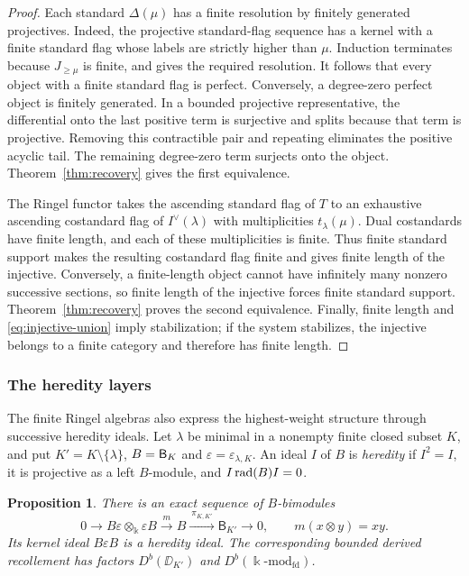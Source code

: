 \documentclass[11pt,reqno]{amsart}
\newcommand{\kk}{\Bbbk}\newcommand{\ZZ}{\mathbb Z}\newcommand{\NN}{\mathbb N}
\newtheorem{proposition}[theorem]{Proposition}
\theoremstyle{definition}
\theoremstyle{remark}
\numberwithin{equation}{section}
\begin{document}
\begin{proof}
Each standard $\Delta(\mu)$ has a finite resolution by finitely
generated projectives. Indeed, the projective standard-flag sequence
has a kernel with a finite standard flag whose labels are strictly
higher than $\mu$. Induction terminates because $J_{\geq\mu}$ is
finite, and gives the required resolution. It follows that every
object with a finite standard flag is perfect. Conversely, a
degree-zero perfect object is finitely generated. In a bounded
projective representative, the differential onto the last positive
term is surjective and splits because that term is projective.
Removing this contractible pair and repeating eliminates the positive
acyclic tail. The remaining degree-zero term surjects onto the object.
Theorem~\ref{thm:recovery} gives the first equivalence.

The Ringel functor takes the ascending standard flag of $T$ to an
exhaustive ascending costandard flag of $I^\vee(\lambda)$ with multiplicities
$t_\lambda(\mu)$. Dual costandards have finite length, and each of
these multiplicities is finite. Thus finite standard support makes
the resulting costandard flag finite and gives finite length of the
injective. Conversely, a finite-length object cannot have infinitely
many nonzero successive sections, so finite length of the injective
forces finite standard support. Theorem~\ref{thm:recovery} proves
the second equivalence. Finally, finite length and
\eqref{eq:injective-union} imply stabilization; if the system
stabilizes, the injective belongs to a finite category and therefore
has finite length.
\end{proof}

\subsubsection{The heredity layers}

The finite Ringel algebras also express the highest-weight structure
through successive heredity ideals. Let $\lambda$ be minimal in a nonempty finite
closed subset $K$, and put $K'=K\setminus\{\lambda\}$,
$B=\mathsf B_K$ and $\varepsilon=\varepsilon_{\lambda,K}$.
An ideal $I$ of $B$ is \emph{heredity} if $I^2=I$, it is projective
as a left $B$-module, and $I\operatorname{rad}(B)I=0$.

\begin{proposition}\label{prop:heredity-layer}
There is an exact sequence of $B$-bimodules
\begin{equation}\label{eq:heredity-sequence}
 0\longrightarrow B\varepsilon\otimes_{\kk}\varepsilon B
   \xrightarrow{\ m\ }B
   \xrightarrow{\ \pi_{K,K'}\ }\mathsf B_{K'}
   \longrightarrow0,
 \qquad m(x\otimes y)=xy.
\end{equation}
Its kernel ideal $B\varepsilon B$ is a heredity ideal. The corresponding
bounded derived recollement has factors $D^b(\DD_{K'})$ and
$D^b(\kk\text{-}\mathrm{mod}_{\mathrm{fd}})$.
\end{proposition}
\end{document}
